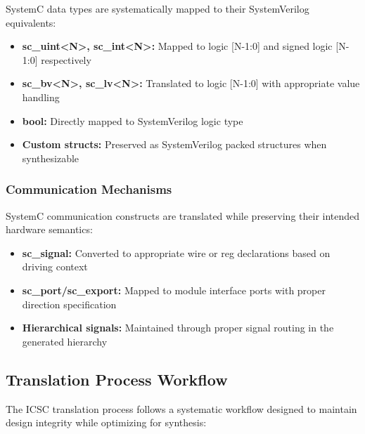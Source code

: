 SystemC data types are systematically mapped to their SystemVerilog equivalents:

\begin{itemize}
\item \textbf{sc\_uint<N>, sc\_int<N>:} Mapped to logic [N-1:0] and signed logic [N-1:0] respectively
\item \textbf{sc\_bv<N>, sc\_lv<N>:} Translated to logic [N-1:0] with appropriate value handling
\item \textbf{bool:} Directly mapped to SystemVerilog logic type
\item \textbf{Custom structs:} Preserved as SystemVerilog packed structures when synthesizable
\end{itemize}

\subsubsection{Communication Mechanisms}
\label{subsubsec:communication_mechanisms}

SystemC communication constructs are translated while preserving their intended hardware semantics:

\begin{itemize}
\item \textbf{sc\_signal:} Converted to appropriate wire or reg declarations based on driving context
\item \textbf{sc\_port/sc\_export:} Mapped to module interface ports with proper direction specification
\item \textbf{Hierarchical signals:} Maintained through proper signal routing in the generated hierarchy
\end{itemize}

\subsection{Translation Process Workflow}
\label{subsec:translation_workflow}

The ICSC translation process follows a systematic workflow designed to maintain design integrity while optimizing for synthesis:

